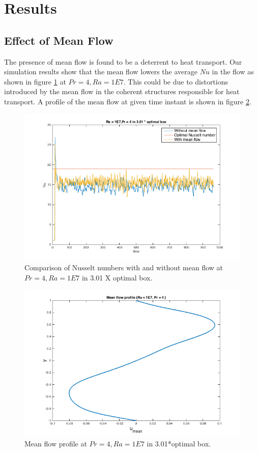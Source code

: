 \documentclass[12pt]{article}
\begin{document}
    
     \section{Results}
     \subsection{Effect of Mean Flow}
     The presence of mean flow is found to be a deterrent to heat transport. Our simulation results show that the mean flow lowers the average $Nu$ in the flow as shown in figure \ref{fig:fig1} at $Pr = 4, Ra = 1E7$. This could be due to distortions introduced by the mean flow in the coherent structures responsible for heat transport. A profile of the mean flow at given time instant is shown in figure \ref{fig:fig2}.
     
     \begin{figure}[!htb]
     	\includegraphics[width=\linewidth]{Nu1E74301opt.png}
     	\caption{Comparison of Nusselt numbers with and without mean flow at $Pr = 4, Ra = 1E7$ in 3.01 X optimal box.}
     	\label{fig:fig1}
     \end{figure}
     
     \begin{figure}[!htb]
     	\includegraphics[width=\linewidth]{umean.png}
     	\caption{Mean flow profile at $Pr = 4, Ra = 1E7$ in 3.01*optimal box.}
     	\label{fig:fig2}
     \end{figure}
     
\end{document}
